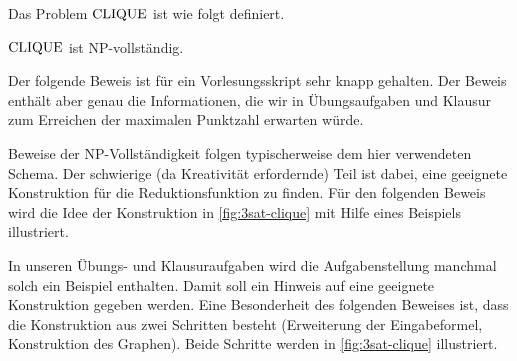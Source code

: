 \begin{Def}[$\CLIQUE$]
    Das Problem $\CLIQUE$ ist wie folgt definiert.
    \begin{center}
    \end{center}
\end{Def}
\begin{Satz}[name={[$\CLIQUE$ ist \ac{NP}-vollständig]}]
	$\CLIQUE$ ist \ac{NP}-vollständig.
\end{Satz}
\begin{Bemerkung}
 Der folgende Beweis ist für ein Vorlesungsskript sehr knapp gehalten.
 Der Beweis enthält aber genau die Informationen, die wir in Übungsaufgaben und Klausur zum Erreichen der maximalen Punktzahl erwarten würde.
 
 Beweise der \ac{NP}-Vollständigkeit folgen typischerweise dem hier verwendeten Schema.
 Der schwierige (da Kreativität erfordernde) Teil ist dabei, eine geeignete Konstruktion für die Reduktionsfunktion zu finden.
 Für den folgenden Beweis wird die Idee der Konstruktion in \autoref{fig:3sat-clique} mit Hilfe eines Beispiels illustriert.
 
 In unseren Übungs- und Klausuraufgaben wird die Aufgabenstellung manchmal solch ein Beispiel enthalten.
 Damit soll ein Hinweis auf eine geeignete Konstruktion gegeben werden.
 Eine Besonderheit des folgenden Beweises ist, dass die Konstruktion aus zwei Schritten besteht (Erweiterung der Eingabeformel, Konstruktion des Graphen). Beide Schritte werden in \autoref{fig:3sat-clique} illustriert.
\end{Bemerkung}

